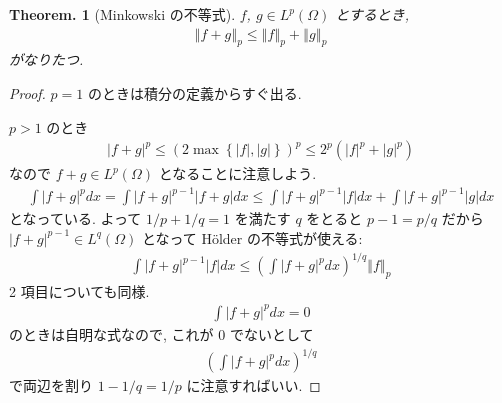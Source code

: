 \documentclass[openany, a4paper, oneside]{jsbook}
\theoremstyle{break}
\theoremstyle{breakdefn}
\newtheorem{thm}{Theorem.}[section]
\newcommand{\abs}[1]{\left|#1\right|}
\newcommand{\norm}[1]{\left\Vert#1\right\Vert}
\newcommand{\rbk}[1]{\left (#1\right)}
\newcommand{\cbk}[1]{\left\{#1\right\}}
\begin{document}
\begin{thm}[Minkowski の不等式]
 $f$, $g \in L^p(\Omega)$ とするとき,
 \begin{align}
  \norm{f + g}_p
  \leq
  \norm{f}_p + \norm{g}_p
 \end{align}
 がなりたつ.
\end{thm}
\begin{proof}
$p=1$ のときは積分の定義からすぐ出る.

$p > 1$ のとき
\begin{align}
 \abs{f + g}^p
 \le
 \rbk{2 \max \cbk{\abs{f}, \abs{g}}}^p
 \le
 2^p \rbk{\abs{f}^p + \abs{g}^p}
\end{align}
なので $f + g \in L^p(\Omega)$ となることに注意しよう.
\begin{align}
 \int \abs{f + g}^p dx
 =
 \int \abs{f + g}^{p-1} \abs{f + g} dx
 \le
 \int \abs{f + g}^{p-1} \abs{f}dx + \int \abs{f + g}^{p-1} \abs{g} dx
\end{align}
となっている.
よって $1/p + 1/q = 1$ を満たす $q$ をとると $p-1 = p/q$ だから
$\abs{f + g}^{p-1} \in L^q (\Omega)$ となって H\"older の不等式が使える:
\begin{align}
 \int \abs{f + g}^{p-1} \abs{f} dx
 \le
 \rbk{\int \abs{f + g}^p dx}^{1/q} \norm{f}_p
\end{align}
2 項目についても同様.
\begin{align}
 \int \abs{f + g}^p dx
 =
 0
\end{align}
のときは自明な式なので, これが $0$ でないとして
\begin{align}
 \rbk{\int \abs{f + g}^p dx}^{1/q}
\end{align}
で両辺を割り $1-1/q = 1/p$ に注意すればいい.
\end{proof}
\end{document}
